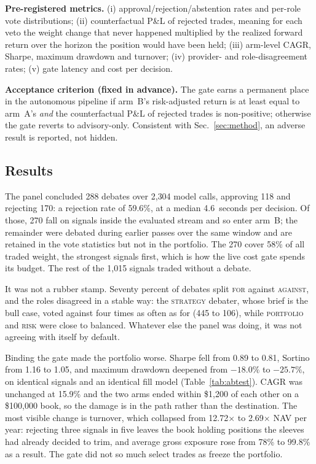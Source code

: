\documentclass[10pt,twocolumn]{IEEEtran}
\begin{document}
\textbf{Pre-registered metrics.} (i) approval/rejection/abstention rates and
per-role vote distributions; (ii) counterfactual P\&L of rejected trades,
meaning for each veto the weight change that never happened multiplied by the
realized forward return over the horizon the position would have been held; (iii)
arm-level CAGR, Sharpe, maximum drawdown and turnover; (iv) provider- and
role-disagreement rates; (v) gate latency and cost per decision.

\textbf{Acceptance criterion (fixed in advance).} The gate earns a permanent
place in the autonomous pipeline if arm~B's risk-adjusted return is at least
equal to arm~A's \emph{and} the counterfactual P\&L of rejected trades is
non-positive; otherwise the gate reverts to advisory-only. Consistent with
Sec.~\ref{sec:method}, an adverse result is reported, not hidden.

\subsection{Results}
\label{sec:abresults}

The panel concluded 288 debates over 2{,}304 model calls, approving 118 and
rejecting 170: a rejection rate of 59.6\%, at a median 4.6~seconds per
decision. Of those, 270 fall on signals inside the evaluated stream and so
enter arm~B; the remainder were debated during earlier passes over the same
window and are retained in the vote statistics but not in the portfolio.
The 270 cover 58\% of all traded weight, the strongest signals first, which is
how the live cost gate spends its budget. The rest of the 1{,}015 signals
traded without a debate.

It was not a rubber stamp. Seventy percent of debates split \textsc{for}
against \textsc{against}, and the roles disagreed in a stable way: the
\textsc{strategy} debater, whose brief is the bull case, voted against four
times as often as for (445 to 106), while \textsc{portfolio} and
\textsc{risk} were close to balanced. Whatever else the panel was doing, it
was not agreeing with itself by default.

Binding the gate made the portfolio worse. Sharpe fell from 0.89 to 0.81,
Sortino from 1.16 to 1.05, and
maximum drawdown deepened from $-18.0\%$ to $-25.7\%$, on identical signals
and an identical fill model (Table~\ref{tab:abtest}). CAGR was unchanged at
15.9\% and the two arms ended within \$1{,}200 of each other on a \$100{,}000
book, so the damage is in the path rather than the destination. The most
visible change is turnover, which collapsed from 12.72$\times$ to
2.69$\times$ NAV per year: rejecting three signals in five leaves the book
holding positions the sleeves had already decided to trim, and average gross
exposure rose from 78\% to 99.8\% as a result. The gate did not so much
select trades as freeze the portfolio.
\end{document}
